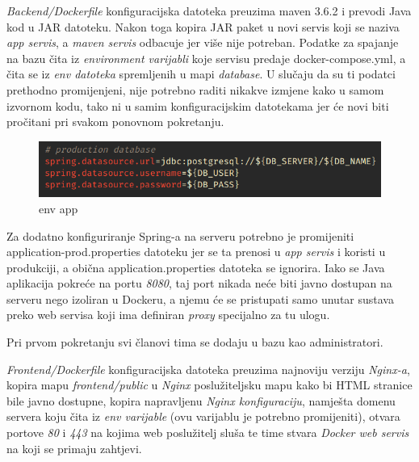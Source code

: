 				
		
		 \textit{Backend/Dockerfile} konfiguracijska datoteka preuzima maven 3.6.2 i prevodi Java kod u JAR datoteku. Nakon toga kopira JAR paket u novi servis koji se naziva  \textit{app servis}, a  \textit{maven servis} odbacuje jer više nije potreban. Podatke za spajanje na bazu čita iz  \textit{environment varijabli} koje servisu predaje docker-compose.yml, a čita se iz  \textit{env datoteka} spremljenih u mapi  \textit{database}. U slučaju da su ti podatci prethodno promijenjeni, nije potrebno raditi nikakve izmjene kako u samom izvornom kodu, tako ni u  samim konfiguracijskim datotekama jer će novi biti pročitani pri svakom ponovnom pokretanju.		
		
		\begin{figure}[H]
					\includegraphics[scale=0.8]{figures/5-env.PNG}
					\centering
					\caption{env app}
					\label{fig:env app}
				\end{figure} 
				
		Za dodatno konfiguriranje Spring-a na serveru potrebno je promijeniti application-prod.properties datoteku jer se ta prenosi u  \textit{app servis} i koristi u produkciji, a obična application.properties datoteka se ignorira. 
Iako se Java aplikacija pokreće na portu  \textit{8080}, taj port nikada neće biti javno dostupan na serveru nego izoliran u Dockeru, a njemu će se pristupati samo unutar sustava preko web servisa koji ima definiran  \textit{proxy} specijalno za tu ulogu.

		Pri prvom pokretanju svi članovi tima se dodaju u bazu kao administratori.\\
		
		
		
		 \textit{Frontend/Dockerfile}  konfiguracijska datoteka preuzima najnoviju verziju  \textit{Nginx-a}, kopira mapu  \textit{frontend/public} u  \textit{Nginx} poslužiteljsku mapu kako bi HTML stranice bile javno dostupne, kopira napravljenu  \textit{Nginx konfiguraciju}, namješta domenu servera koju čita iz  \textit{env varijable} (ovu varijablu je potrebno promijeniti), otvara portove  \textit{80} i  \textit{443} na kojima web poslužitelj sluša te time stvara  \textit{Docker web servis} na koji se primaju zahtjevi.


